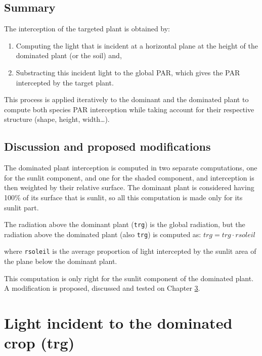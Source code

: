 \documentclass[
]{book}
\providecommand{\tightlist}{%
  \setlength{\itemsep}{0pt}\setlength{\parskip}{0pt}}
\begin{document}
\hypertarget{summary}{%
\section{Summary}\label{summary}}

The interception of the targeted plant is obtained by:

\begin{enumerate}
\def\labelenumi{\arabic{enumi}.}
\tightlist
\item
  Computing the light that is incident at a horizontal plane at the height of the dominated plant (or the soil) and,
\item
  Substracting this incident light to the global PAR, which gives the PAR intercepted by the target plant.
\end{enumerate}

This process is applied iteratively to the dominant and the dominated plant to compute both species PAR interception while taking account for their respective structure (shape, height, width\ldots).

\hypertarget{discussion-and-proposed-modifications}{%
\section{Discussion and proposed modifications}\label{discussion-and-proposed-modifications}}

The dominated plant interception is computed in two separate computations, one for the sunlit component, and one for the shaded component, and interception is then weighted by their relative surface. The dominant plant is considered having 100\% of its surface that is sunlit, so all this computation is made only for its sunlit part.

The radiation above the dominant plant (\texttt{trg}) is the global radiation, but the radiation above the dominated plant (also \texttt{trg}) is computed as:
\(trg=trg\cdot rsoleil\)

where \texttt{rsoleil} is the average proportion of light intercepted by the sunlit area of the plane below the dominant plant.

This computation is only right for the sunlit component of the dominated plant. A modification is proposed, discussed and tested on Chapter \ref{trg}.

\hypertarget{trg}{%
\chapter{Light incident to the dominated crop (trg)}\label{trg}}
\end{document}
